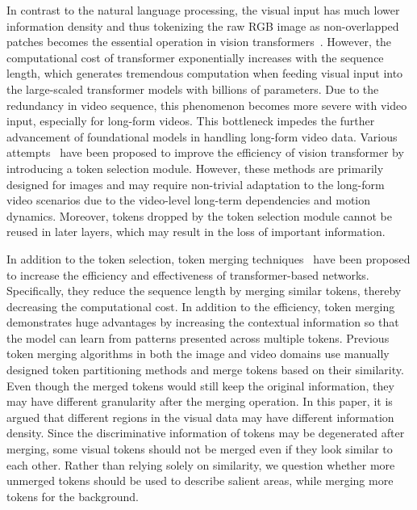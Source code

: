 \documentclass{article}
\begin{document}
In contrast to the natural language processing, the visual input has much lower information density and thus tokenizing the raw RGB image as non-overlapped patches becomes the essential operation in vision transformers~\citep{wang2022deformable, bertasius2021space, dosovitskiy2020vit}. However, the computational cost of transformer exponentially increases with the sequence length, which generates tremendous computation when feeding visual input into the large-scaled transformer models with billions of parameters. Due to the redundancy in video sequence, this phenomenon becomes more severe with video input, especially for long-form videos. This bottleneck impedes the further advancement of foundational models in handling long-form video data. Various attempts~\citep{yin2021adavit,wang2021efficient,meng2022adavit,rao2021dynamicvit,liang2022not} have been proposed to improve the efficiency of vision transformer by introducing a token selection module. However, these methods are primarily designed for images and may require non-trivial adaptation to the long-form video scenarios due to the video-level long-term dependencies and motion dynamics. Moreover, tokens dropped by the token selection module cannot be reused in later layers, which may result in the loss of important information.

In addition to the token selection, token merging techniques~\citep{bolya2022tome, ren2023testa, bolya2023tomesd, li2023vidtome} have been proposed to increase the efficiency and effectiveness of transformer-based networks. Specifically, they reduce the sequence length by merging similar tokens, thereby decreasing the computational cost. In addition to the efficiency, token merging demonstrates huge advantages by increasing the contextual information so that the model can learn from patterns presented across multiple tokens. Previous token merging algorithms in both the image and video domains use manually designed token partitioning methods and merge tokens based on their similarity. Even though the merged tokens would still keep the original information, they may have different granularity after the merging operation. In this paper, it is argued that different regions in the visual data may have different information density. Since the discriminative information of tokens may be degenerated after merging, some visual tokens should not be merged even if they look similar to each other. Rather than relying solely on similarity, we question whether more unmerged tokens should be used to describe salient areas, while merging more tokens for the background.
\end{document}
